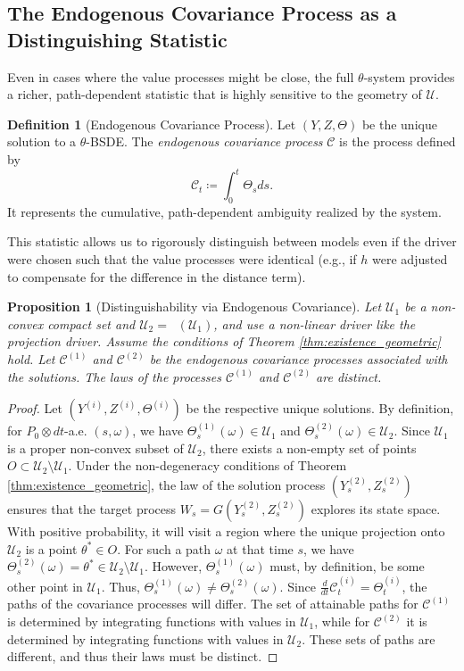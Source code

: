 \documentclass[12pt, letterpaper]{amsart}
\newcommand{\Ucal}{\mathcal{U}}
\DeclareMathOperator*{\overlineconv}{\overline{conv}}
\theoremstyle{plain}
\newtheorem{proposition}[theorem]{Proposition}
\theoremstyle{definition}
\newtheorem{definition}[theorem]{Definition}
\theoremstyle{remark}
\numberwithin{equation}{section} %
\begin{document}
\subsection{The Endogenous Covariance Process as a Distinguishing Statistic}
Even in cases where the value processes might be close, the full $\theta$-system provides a richer, path-dependent statistic that is highly sensitive to the geometry of $\Ucal$.

\begin{definition}[Endogenous Covariance Process]
Let $(Y,Z,\Theta)$ be the unique solution to a $\theta$-BSDE. The \emph{endogenous covariance process} $\mathcal{C}$ is the process defined by
\begin{equation}
    \mathcal{C}_t \coloneqq \int_0^t \Theta_s ds.
\end{equation}
It represents the cumulative, path-dependent ambiguity realized by the system.
\end{definition}

This statistic allows us to rigorously distinguish between models even if the driver were chosen such that the value processes were identical (e.g., if $h$ were adjusted to compensate for the difference in the distance term).

\begin{proposition}[Distinguishability via Endogenous Covariance]
Let $\Ucal_1$ be a non-convex compact set and $\Ucal_2 = \overlineconv(\Ucal_1)$, and use a non-linear driver like the projection driver. Assume the conditions of Theorem \ref{thm:existence_geometric} hold. Let $\mathcal{C}^{(1)}$ and $\mathcal{C}^{(2)}$ be the endogenous covariance processes associated with the solutions. The laws of the processes $\mathcal{C}^{(1)}$ and $\mathcal{C}^{(2)}$ are distinct.
\end{proposition}
\begin{proof}
Let $(Y^{(i)}, Z^{(i)}, \Theta^{(i)})$ be the respective unique solutions. By definition, for $P_0 \otimes dt$-a.e. $(s,\omega)$, we have $\Theta^{(1)}_s(\omega) \in \Ucal_1$ and $\Theta^{(2)}_s(\omega) \in \Ucal_2$.
Since $\Ucal_1$ is a proper non-convex subset of $\Ucal_2$, there exists a non-empty set of points $O \subset \Ucal_2 \setminus \Ucal_1$. Under the non-degeneracy conditions of Theorem \ref{thm:existence_geometric}, the law of the solution process $(Y_s^{(2)}, Z_s^{(2)})$ ensures that the target process $W_s = G(Y_s^{(2)}, Z_s^{(2)})$ explores its state space. With positive probability, it will visit a region where the unique projection onto $\Ucal_2$ is a point $\theta^* \in O$.
For such a path $\omega$ at that time $s$, we have $\Theta^{(2)}_s(\omega) = \theta^* \in \Ucal_2 \setminus \Ucal_1$. However, $\Theta^{(1)}_s(\omega)$ must, by definition, be some other point in $\Ucal_1$. Thus, $\Theta^{(1)}_s(\omega) \neq \Theta^{(2)}_s(\omega)$.
Since $\frac{d}{dt}\mathcal{C}^{(i)}_t = \Theta^{(i)}_t$, the paths of the covariance processes will differ. The set of attainable paths for $\mathcal{C}^{(1)}$ is determined by integrating functions with values in $\Ucal_1$, while for $\mathcal{C}^{(2)}$ it is determined by integrating functions with values in $\Ucal_2$. These sets of paths are different, and thus their laws must be distinct.
\end{proof}
\end{document}

